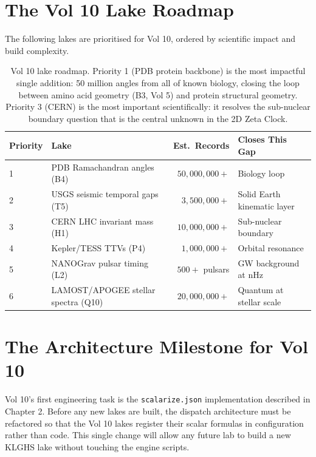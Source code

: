 \documentclass[11pt, letterpaper, openany]{book}
\begin{document}
\section{The Vol 10 Lake Roadmap}

The following lakes are prioritised for Vol 10, ordered by scientific impact and
build complexity.

\begin{table}[H]
\centering
\renewcommand{\arraystretch}{1.4}
\small
\begin{tabular}{|l|l|r|l|}
\hline
\rowcolor{kishblue!10}
\textbf{Priority} & \textbf{Lake} & \textbf{Est.\ Records} & \textbf{Closes This Gap} \\
\hline\hline
1 & PDB Ramachandran angles (B4)       & $50{,}000{,}000+$ & Biology loop \\
2 & USGS seismic temporal gaps (T5)    & $3{,}500{,}000+$  & Solid Earth kinematic layer \\
3 & CERN LHC invariant mass (H1)       & $10{,}000{,}000+$ & Sub-nuclear boundary \\
4 & Kepler/TESS TTVs (P4)              & $1{,}000{,}000+$  & Orbital resonance \\
5 & NANOGrav pulsar timing (L2)        & $500+$ pulsars    & GW background at nHz \\
6 & LAMOST/APOGEE stellar spectra (Q10) & $20{,}000{,}000+$ & Quantum at stellar scale \\
\hline
\end{tabular}
\caption{Vol 10 lake roadmap. Priority 1 (PDB protein backbone) is the most
impactful single addition: 50 million angles from all of known biology, closing
the loop between amino acid geometry (B3, Vol 5) and protein structural geometry.
Priority 3 (CERN) is the most important scientifically: it resolves the sub-nuclear
boundary question that is the central unknown in the 2D Zeta Clock.}
\label{tab:v10_roadmap}
\end{table}

\section{The Architecture Milestone for Vol 10}

Vol 10's first engineering task is the \texttt{scalarize.json} implementation
described in Chapter 2. Before any new lakes are built, the dispatch architecture
must be refactored so that the Vol 10 lakes register their scalar formulas in
configuration rather than code. This single change will allow any future lab
to build a new KLGHS lake without touching the engine scripts.
\end{document}
